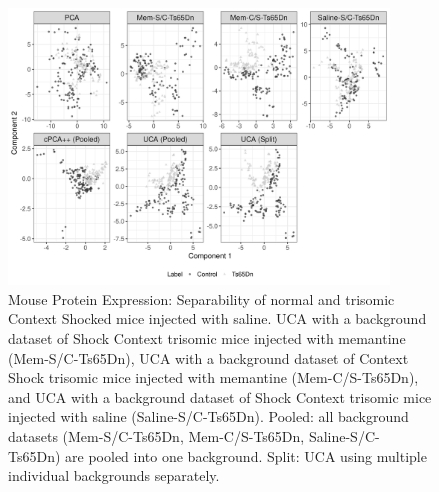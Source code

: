 \documentclass[10pt]{article}
\begin{document}
\begin{figure}[th!]
  \centering
  \includegraphics[width = 0.9\textwidth]{figure/Mouse_split_stack_Ts65Dn_bw.png}
  \caption{Mouse Protein Expression: Separability of normal and trisomic Context Shocked mice injected with saline. UCA with a background dataset of Shock Context trisomic mice injected with memantine (Mem-S/C-Ts65Dn), UCA with a background dataset of Context Shock trisomic mice injected with memantine (Mem-C/S-Ts65Dn), and UCA with a background dataset of Shock Context trisomic mice injected with saline (Saline-S/C-Ts65Dn). Pooled: all background datasets (Mem-S/C-Ts65Dn, Mem-C/S-Ts65Dn, Saline-S/C-Ts65Dn) are pooled into one background. Split: UCA using multiple individual backgrounds separately.}
  \label{fig:MouseSplitStack}
\end{figure}

\end{document}
